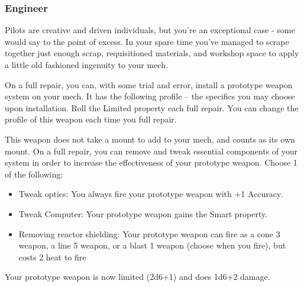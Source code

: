 \subsubsection{Engineer}

\begin{talent}
{Pilots are creative and driven individuals, but you're an exceptional case - some would say to the point of excess. In your spare time you've managed to scrape together just enough scrap, requisitioned materials, and workshop space to apply a little old fashioned ingenuity to your mech.}

On a full repair, you can, with some trial and error, install a prototype weapon system on your mech. It has the following profile -- the specifics you may choose upon installation. Roll the Limited property each full repair. You can change the profile of this weapon each time you full repair. 

\gearBox
[name = {Prototype Weapon},
fluff = {},
template = {\Main (Choose 1; \Melee, \Rifle, \Cannon, \Launcher, \CQB)\newline
\Limited{1d6+2}, \Overcharged\newline
\Threat{1} (melee) or \Range{8} (ranged)\newline
1d6 \kinetic, \explosive or \energy damage}]
This weapon does not take a mount to add to your mech, and counts as its own mount.
On a full repair, you can remove and tweak essential components of your system in order to increase the effectiveness of your prototype weapon. 
Choose 1 of the following: 
\begin{itemize}
\item Tweak optics:
     You always fire your prototype weapon with +1 Accuracy. 
\item Tweak Computer: 
     Your prototype weapon gains the Smart property. 
\item Removing reactor shielding:
     Your prototype weapon can fire as a cone 3 weapon, a line 5 weapon, or a blast 1 weapon (choose when you fire), but costs 2 heat to fire
\end{itemize}
Your prototype weapon is now limited (2d6+1) and does 1d6+2 damage.
\end{talent}
